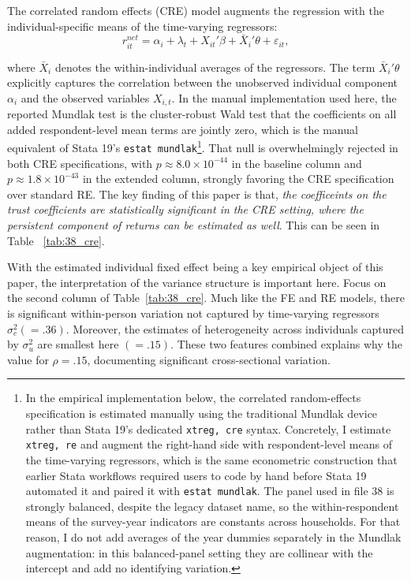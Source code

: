 \par The correlated random effects (CRE) model  augments the regression with the individual-specific means of the time-varying regressors:
\[
r^{net}_{it}
=
\alpha_i + \lambda_t + X_{it}'\beta + \bar{X}_i'\theta + \varepsilon_{it},
\]

\par where $\bar{X}_i$ denotes the within-individual averages of the regressors. The term $\bar{X}_i'\theta$ explicitly captures the correlation between the unobserved individual component $\alpha_i$ and the observed variables $X_{i,t}$. In the manual implementation used here, the reported Mundlak test is the cluster-robust Wald test that the coefficients on all added respondent-level mean terms are jointly zero, which is the manual equivalent of Stata 19's \texttt{estat mundlak}\footnote{In the empirical implementation below, the correlated random-effects specification is estimated manually using the traditional Mundlak device rather than Stata 19's dedicated \texttt{xtreg, cre} syntax. Concretely, I estimate \texttt{xtreg, re} and augment the right-hand side with respondent-level means of the time-varying regressors, which is the same econometric construction that earlier Stata workflows required users to code by hand before Stata 19 automated it and paired it with \texttt{estat mundlak}. The panel used in file 38 is strongly balanced, despite the legacy dataset name, so the within-respondent means of the survey-year indicators are constants across households. For that reason, I do not add averages of the year dummies separately in the Mundlak augmentation: in this balanced-panel setting they are collinear with the intercept and add no identifying variation.}. That null is overwhelmingly rejected in both CRE specifications, with $p \approx 8.0\times 10^{-44}$ in the baseline column and $p \approx 1.8\times 10^{-43}$ in the extended column, strongly favoring the CRE specification over standard RE. The key finding of this paper is that, \textit{the coefficeints on the trust coefficients are statistically significant in the CRE setting, where the persistent component of returns can be estimated as well}. This can be seen in Table ~\ref{tab:38_cre}.

\par With the estimated individual fixed effect being a key empirical object of this paper, the interpretation of the variance structure is important here. Focus on the second column of Table~\ref{tab:38_cre}. Much like the FE and RE models, there is significant within-person variation not captured by time-varying regressors $\sigma_e^2(=.36)$. Moreover, the estimates of heterogeneity across individuals captured by $\sigma_u^2$ are smallest here $(=.15)$. These two features combined explains why the value for $\rho=.15$, documenting significant cross-sectional variation.

